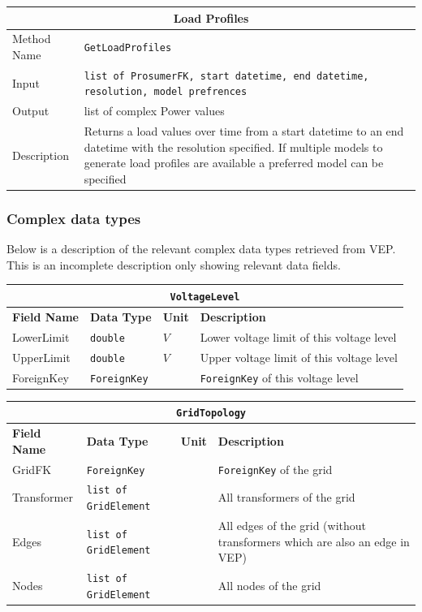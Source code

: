 \begin{tabular}{ l  p{12cm}} 
    \hline
    \multicolumn{2}{c}{\textbf{Load Profiles}}\\
    \hline
    Method Name     & \texttt{GetLoadProfiles} \\
    Input           & \texttt{list of ProsumerFK, start datetime, end datetime, resolution, model prefrences}\\
    Output          & list of complex Power values \\
    Description     & Returns a load values over time from a start datetime to an end datetime with the resolution specified. If multiple models to generate load profiles are available a preferred model can be specified \\
\end{tabular}

\subsubsection{Complex data types}

Below is a description of the relevant complex data types retrieved from VEP. This is an incomplete
description only showing relevant data fields.

\vspace{.5cm}

\begin{tabular}{ l p{3cm} l p{8cm}} 
    \hline
    \multicolumn{4}{c}{\texttt{VoltageLevel}}\\
    \hline
    \textbf{Field Name} & \textbf{Data Type}       & \textbf{Unit} & \textbf{Description} \\
    \hline
    LowerLimit          & \texttt{double}          & $V$           & Lower voltage limit of this voltage level\\
    UpperLimit          & \texttt{double}          & $V$           & Upper voltage limit of this voltage level\\
    ForeignKey          & \texttt{ForeignKey}      &               & \texttt{ForeignKey} of this voltage level
\end{tabular}

\vspace{.5cm}

\begin{tabular}{ l p{3cm} l p{8cm}} 
    \hline
    \multicolumn{4}{c}{\texttt{GridTopology}}\\
    \hline
    \textbf{Field Name} & \textbf{Data Type}              & \textbf{Unit} & \textbf{Description} \\
    \hline
    GridFK              & \texttt{ForeignKey}                       &               & \texttt{ForeignKey} of the grid\\
    Transformer         & \texttt{list of GridElement}    &         & All transformers of the grid\\
    Edges               & \texttt{list of GridElement}    &         & All edges of the grid (without transformers which are also an edge in VEP)\\
    Nodes               & \texttt{list of GridElement}    &         & All nodes of the grid \\
\end{tabular}

